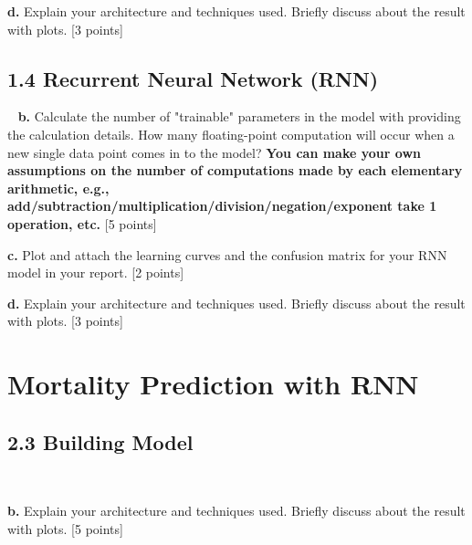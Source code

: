 \documentclass[12pt]{article}
\begin{document}
\bigskip
\textbf{d.} Explain your architecture and techniques used. Briefly discuss about the result with plots. [3 points]

\subsection*{1.4 Recurrent Neural Network (RNN)}
~
\textbf{b.} Calculate the number of "trainable" parameters in the model with providing the calculation details. How many floating-point computation will occur when a new single data point comes in to the model?  \textbf{You can make your own assumptions on the number of computations made by each elementary arithmetic, e.g., add/subtraction/multiplication/division/negation/exponent take 1 operation, etc.} [5 points]

\bigskip

\textbf{c.} Plot and attach the learning curves and the confusion matrix for your RNN model in your report. [2 points]

\bigskip

\textbf{d.} Explain your architecture and techniques used. Briefly discuss about the result with plots. [3 points]

\section{Mortality Prediction with RNN}

\subsection*{2.3 Building Model}
~

\textbf{b.} Explain your architecture and techniques used. Briefly discuss about the result with plots. [5 points]
\end{document}
